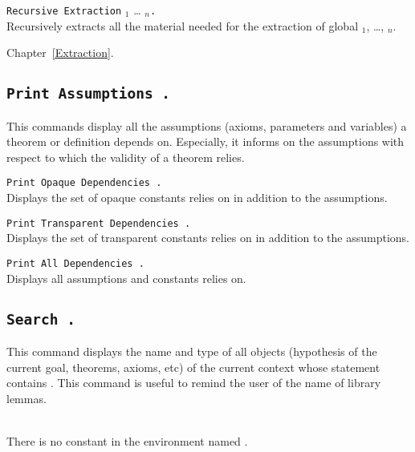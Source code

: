 \begin{Variants}
\item \texttt{Recursive Extraction} {\qualid$_1$} \ldots{} {\qualid$_n$}{\tt .}\\
  Recursively extracts all the material needed for the extraction of
  global {\qualid$_1$}, \ldots, {\qualid$_n$}.
\end{Variants}

\SeeAlso Chapter~\ref{Extraction}.

\subsection[\tt Print Assumptions {\qualid}.]{\tt Print Assumptions {\qualid}.}
\label{PrintAssumptions}

This commands display all the assumptions (axioms, parameters and
variables) a theorem or definition depends on.  Especially, it informs
on the assumptions with respect to which the validity of a theorem
relies.

\begin{Variants}
\item \texttt{\tt Print Opaque Dependencies {\qualid}.
  }\\
  Displays the set of opaque constants {\qualid} relies on in addition
  to the assumptions.
\item \texttt{\tt Print Transparent Dependencies {\qualid}.
  }\\
  Displays the set of transparent constants {\qualid} relies on in addition
  to the assumptions.
\item \texttt{\tt Print All Dependencies {\qualid}.
  }\\
  Displays all assumptions and constants {\qualid} relies on.
\end{Variants}

\subsection[\tt Search {\qualid}.]{\tt Search {\qualid}.}
This command displays the name and type of all objects (hypothesis of
the current goal, theorems, axioms, etc) of the current context whose
statement contains \qualid. This command is useful to remind the user
of the name of library lemmas.

\begin{ErrMsgs}
\item {}\\
    There is no constant in the environment named \qualid.
\end{ErrMsgs}

